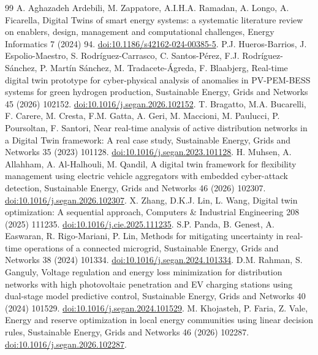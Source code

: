 \documentclass[preprint,12pt]{elsarticle}
\begin{document}
\begin{thebibliography}{99}
 A. Aghazadeh Ardebili, M. Zappatore, A.I.H.A. Ramadan, A. Longo, A. Ficarella, Digital Twins of smart energy systems: a systematic literature review on enablers, design, management and computational challenges, Energy Informatics 7 (2024) 94. \href{https://doi.org/10.1186/s42162-024-00385-5}{doi:10.1186/s42162-024-00385-5}.
 P.J. Hueros-Barrios, J. Espolio-Maestro, S. Rodr\'iguez-Carrasco, C. Santos-P\'erez, F.J. Rodr\'iguez-S\'anchez, P. Mart\'in S\'anchez, M. Tradacete-\'Agreda, F. Blaabjerg, Real-time digital twin prototype for cyber-physical analysis of anomalies in PV-PEM-BESS systems for green hydrogen production, Sustainable Energy, Grids and Networks 45 (2026) 102152. \href{https://doi.org/10.1016/j.segan.2026.102152}{doi:10.1016/j.segan.2026.102152}.
 T. Bragatto, M.A. Bucarelli, F. Carere, M. Cresta, F.M. Gatta, A. Geri, M. Maccioni, M. Paulucci, P. Poursoltan, F. Santori, Near real-time analysis of active distribution networks in a Digital Twin framework: A real case study, Sustainable Energy, Grids and Networks 35 (2023) 101128. \href{https://doi.org/10.1016/j.segan.2023.101128}{doi:10.1016/j.segan.2023.101128}.
 H. Muhsen, A. Allahham, A. Al-Halhouli, M. Qandil, A digital twin framework for flexibility management using electric vehicle aggregators with embedded cyber-attack detection, Sustainable Energy, Grids and Networks 46 (2026) 102307. \href{https://doi.org/10.1016/j.segan.2026.102307}{doi:10.1016/j.segan.2026.102307}.
 X. Zhang, D.K.J. Lin, L. Wang, Digital twin optimization: A sequential approach, Computers \& Industrial Engineering 208 (2025) 111235. \href{https://doi.org/10.1016/j.cie.2025.111235}{doi:10.1016/j.cie.2025.111235}.
 S.P. Panda, B. Genest, A. Easwaran, R. Rigo-Mariani, P. Lin, Methods for mitigating uncertainty in real-time operations of a connected microgrid, Sustainable Energy, Grids and Networks 38 (2024) 101334. \href{https://doi.org/10.1016/j.segan.2024.101334}{doi:10.1016/j.segan.2024.101334}.
 D.M. Rahman, S. Ganguly, Voltage regulation and energy loss minimization for distribution networks with high photovoltaic penetration and EV charging stations using dual-stage model predictive control, Sustainable Energy, Grids and Networks 40 (2024) 101529. \href{https://doi.org/10.1016/j.segan.2024.101529}{doi:10.1016/j.segan.2024.101529}.
 M. Khojasteh, P. Faria, Z. Vale, Energy and reserve optimization in local energy communities using linear decision rules, Sustainable Energy, Grids and Networks 46 (2026) 102287. \href{https://doi.org/10.1016/j.segan.2026.102287}{doi:10.1016/j.segan.2026.102287}.

\end{thebibliography}
\end{document}
